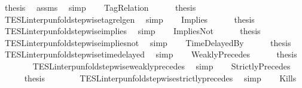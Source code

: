 \begin{isabellebody}
\ {\isacharquery}thesis\ \isamarkupfalse%
\ assms\ \isamarkupfalse%
\ simp\isanewline
{}\isamarkupfalse%
\isanewline
\ \ \isamarkupfalse%
\ TagRelation\isanewline
\ \ \ \ \isamarkupfalse%
\ {\isacharquery}thesis\ \isamarkupfalse%
\ TESL{\isacharunderscore}interp{\isacharunderscore}unfold{\isacharunderscore}stepwise{\isacharunderscore}tagrelgen\ \isamarkupfalse%
\ simp\isanewline
{}\isamarkupfalse%
\isanewline
\ \ \isamarkupfalse%
\ Implies\isanewline
\ \ \ \ \isamarkupfalse%
\ {\isacharquery}thesis\ \isamarkupfalse%
\ TESL{\isacharunderscore}interp{\isacharunderscore}unfold{\isacharunderscore}stepwise{\isacharunderscore}implies\ \isamarkupfalse%
\ simp\isanewline
{}\isamarkupfalse%
\isanewline
\ \ \isamarkupfalse%
\ ImpliesNot\isanewline
\ \ \ \ \isamarkupfalse%
\ {\isacharquery}thesis\ \isamarkupfalse%
\ TESL{\isacharunderscore}interp{\isacharunderscore}unfold{\isacharunderscore}stepwise{\isacharunderscore}implies{\isacharunderscore}not\ \isamarkupfalse%
\ simp\isanewline
{}\isamarkupfalse%
\isanewline
\ \ \isamarkupfalse%
\ TimeDelayedBy\isanewline
\ \ \ \ \isamarkupfalse%
\ {\isacharquery}thesis\ \isamarkupfalse%
\ TESL{\isacharunderscore}interp{\isacharunderscore}unfold{\isacharunderscore}stepwise{\isacharunderscore}timedelayed\ \isamarkupfalse%
\ simp\isanewline
{}\isamarkupfalse%
\isanewline
\ \ \isamarkupfalse%
\ WeaklyPrecedes\isanewline
\ \ \ \ \isamarkupfalse%
\ {\isacharquery}thesis\isanewline
\ \ \ \ \ \ \isamarkupfalse%
\ TESL{\isacharunderscore}interp{\isacharunderscore}unfold{\isacharunderscore}stepwise{\isacharunderscore}weakly{\isacharunderscore}precedes\ \isamarkupfalse%
\ simp\isanewline
{}\isamarkupfalse%
\isanewline
\ \ \isamarkupfalse%
\ StrictlyPrecedes\isanewline
\ \ \ \ \isamarkupfalse%
\ {\isacharquery}thesis\isanewline
\ \ \ \ \ \ \isamarkupfalse%
\ TESL{\isacharunderscore}interp{\isacharunderscore}unfold{\isacharunderscore}stepwise{\isacharunderscore}strictly{\isacharunderscore}precedes\ \isamarkupfalse%
\ simp\isanewline
{}\isamarkupfalse%
\isanewline
\ \ \isamarkupfalse%
\ Kills\isanewline

\end{isabellebody}
